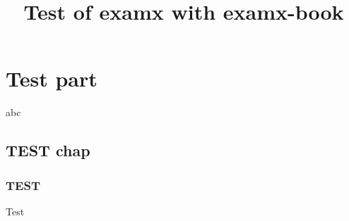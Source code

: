 \documentclass{article}
\title{Test of examx with examx-book}
\begin{document}
    \maketitle
    \tableofcontents
    
    
    \part{Test part}
    
    abc
    \chapter{TEST chap}
    \section{TEST}
    Test
\end{document}
